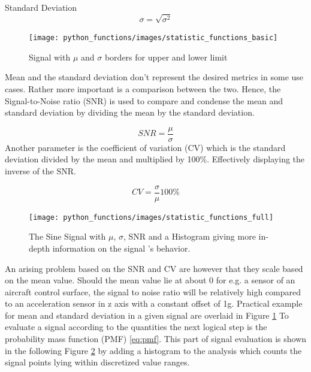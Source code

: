 Standard Deviation
\begin{equation}
    \label{eq:stdev_disc}
    \sigma = \sqrt{\sigma^2}
\end{equation}

\begin{figure}[h]
    \centering
    \texttt{[image: python\_functions/images/statistic\_functions\_basic]}
    \caption[Signal analysis with $\mu$ and $\sigma$]{Signal with $\mu$ and $\sigma$ borders for upper and lower limit}
    \label{fig:statistics_basic}
\end{figure}

Mean and the standard deviation don't represent the desired metrics in some use cases. Rather more important is a comparison between the two. Hence, the Signal-to-Noise ratio (SNR) is used to compare and condense the mean and standard deviation by dividing the mean by the standard deviation.

\begin{equation}
    \label{eq:snr}
    SNR=\frac{\mu}{\sigma}
\end{equation}
Another parameter is the coefficient of variation (CV) which is the standard deviation divided by the mean and multiplied by 100\%. Effectively displaying the inverse of the SNR.

\begin{equation}
    \label{eq:coeff_var}
    CV = \frac{\sigma}{\mu}100\%
\end{equation}

\begin{figure}[h]
    \centering
    \texttt{[image: python\_functions/images/statistic\_functions\_full]}
    \caption[Full Signal Analysis]{The Sine Signal with $\mu$, $\sigma$, SNR and a Histogram giving more in-depth information on the signal 's behavior.}
    \label{fig:statistics_full}
\end{figure}

An arising problem based on the SNR and CV are however that they scale based on the mean value. Should the mean value lie at about 0 for e.g. a sensor of an aircraft control surface, the signal to noise ratio will be relatively high compared to an acceleration sensor in z axis with a constant offset of 1g. Practical example for mean and standard deviation in a given signal are overlaid in Figure \ref{fig:statistics_basic}
To evaluate a signal according to the quantities the next logical step is the probability mass function (PMF) \ref{eq:pmf}. This part of signal evaluation is shown in the following Figure \ref{fig:statistics_full} by adding a histogram to the analysis which counts the signal points lying within discretized value ranges.

